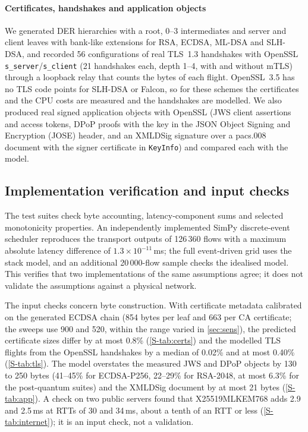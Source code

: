 \documentclass[preprint,12pt]{elsarticle}
\newcommand{\ms}{\,ms\xspace}
\begin{document}
\paragraph{Certificates, handshakes and application objects} We generated DER hierarchies with a root, 0--3 intermediates and server and client leaves with bank-like extensions for RSA, ECDSA, ML-DSA and SLH-DSA, and recorded 56 configurations of real TLS~1.3 handshakes with OpenSSL \texttt{s\_server}/\texttt{s\_client} (21 handshakes each, depth 1--4, with and without mTLS) through a loopback relay that counts the bytes of each flight. OpenSSL~3.5 has no TLS code points for SLH-DSA or Falcon, so for these schemes the certificates and the CPU costs are measured and the handshakes are modelled. We also produced real signed application objects with OpenSSL (JWS client assertions and access tokens, DPoP proofs with the key in the JSON Object Signing and Encryption (JOSE) header, and an XMLDSig signature over a pacs.008 document with the signer certificate in \texttt{KeyInfo}) and compared each with the model.

\subsection{Implementation verification and input checks}
The test suites check byte accounting, latency-component sums and selected monotonicity properties. An independently implemented SimPy discrete-event scheduler reproduces the transport outputs of 126\,360 flows with a maximum absolute latency difference of $1.3\times10^{-11}$\ms; the full event-driven grid uses the stack model, and an additional 20\,000-flow sample checks the idealised model. This verifies that two implementations of the same assumptions agree; it does not validate the assumptions against a physical network.

The input checks concern byte construction. With certificate metadata calibrated on the generated ECDSA chain (854 bytes per leaf and 663 per CA certificate; the sweeps use 900 and 520, within the range varied in \cref{sec:sens}), the predicted certificate sizes differ by at most 0.8\% (\cref{S-tab:certs}) and the modelled TLS flights from the OpenSSL handshakes by a median of 0.02\% and at most 0.40\% (\cref{S-tab:tls}). The model overstates the measured JWS and DPoP objects by 130 to 250 bytes (41--45\% for ECDSA-P256, 22--29\% for RSA-2048, at most 6.3\% for the post-quantum suites) and the XMLDSig document by at most 21 bytes (\cref{S-tab:app}). A check on two public servers found that X25519MLKEM768 adds 2.9 and 2.5\ms at RTTs of 30 and 34\ms, about a tenth of an RTT or less (\cref{S-tab:internet}); it is an input check, not a validation.
\end{document}
